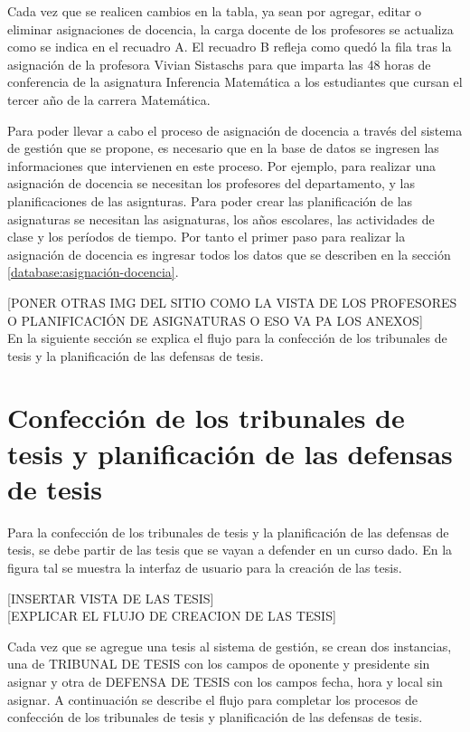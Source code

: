 Cada vez que se realicen cambios en la tabla, ya sean por agregar, editar o eliminar 
asignaciones de docencia, la carga docente de los profesores se actualiza como se indica 
en el recuadro A. El recuadro B refleja como quedó la fila tras la asignación de la profesora 
Vivian Sistaschs para que imparta las 48 horas de conferencia de la asignatura Inferencia Matemática
a los estudiantes que cursan el tercer año de la carrera Matemática.


Para poder llevar a cabo el proceso de asignación de docencia a través del sistema de 
gestión que se propone, es necesario que en la base de datos se ingresen las informaciones 
que intervienen en este proceso. Por ejemplo, para realizar una asignación de docencia se necesitan 
los profesores del departamento, 
y las planificaciones de las asignturas. Para poder crear las planificación de las asignaturas 
se necesitan las asignaturas, los años escolares, las actividades de clase y los períodos de tiempo.
Por tanto el primer paso para realizar la asignación de docencia es ingresar todos los datos que 
se describen en la sección \ref{database:asignación-docencia}.


[PONER OTRAS IMG DEL SITIO COMO LA VISTA DE LOS PROFESORES O PLANIFICACIÓN DE ASIGNATURAS 
O ESO VA PA LOS ANEXOS]\\


En la siguiente sección se explica el flujo para la confección de los 
tribunales de tesis y la planificación de las defensas de tesis.

\section{Confección de los tribunales de tesis y planificación de las defensas de tesis}
Para la confección de los tribunales de tesis y la planificación de las defensas de tesis,
se debe partir de las tesis que se vayan a defender en un curso dado. En la 
figura tal se muestra la interfaz de usuario para la creación de las tesis.

[INSERTAR VISTA DE LAS TESIS] \\

[EXPLICAR EL FLUJO DE CREACION DE LAS TESIS]

Cada vez que se agregue una tesis al sistema de gestión, se crean dos instancias, 
una de TRIBUNAL DE TESIS con los campos de oponente y presidente sin asignar y otra 
de DEFENSA DE TESIS con los campos fecha, hora y local sin asignar. A continuación 
se describe el flujo para completar los procesos de confección de los tribunales de tesis
y planificación de las defensas de tesis.

